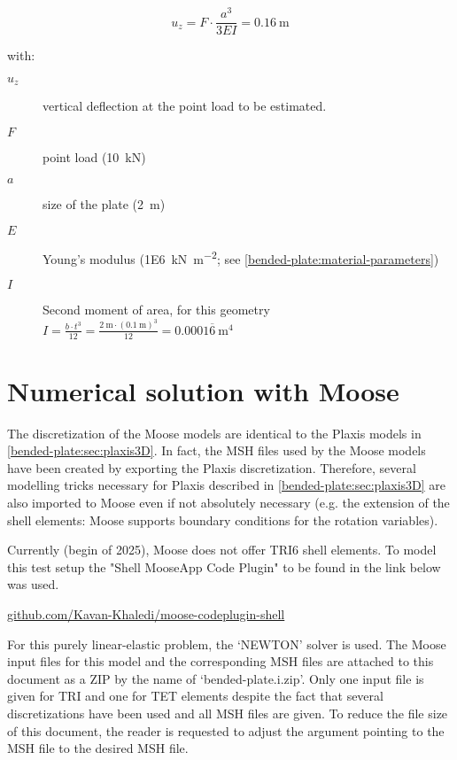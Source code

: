 \begin{equation}
    \label{bended-plate:analytical-solution}
    u_z = F \cdot \frac{a ^ 3}{3EI} = \qty{0.16}{\metre}
\end{equation}

\begin{samepage}
    with:
    \begin{description}
        \item[$u_{z}$] vertical deflection at the point load to be estimated.
        \item[$F$] point load (\qty{10}{\kilo\newton})
        \item[$a$] size of the plate (\qty{2}{\metre})
        \item[$E$] Young's modulus (\qty[per-mode = symbol]{1E6}{\kilo\newton\per\square\metre}; see \autoref{bended-plate:material-parameters})
        \item[$I$] Second moment of area, for this geometry $I = \frac{b \cdot t^3}{12} = \frac{\qty{2}{\metre} \cdot (\qty{0.1}{\metre})^3}{12} = 0.0001\overline{6} \qty{}{\metre}^4 $
    \end{description}
\end{samepage}

\section{Numerical solution with Moose}
\label{bended-plate:sec:moose}

The discretization of the Moose models are identical to the Plaxis models in
\autoref{bended-plate:sec:plaxis3D}. In fact, the MSH files used by the Moose
models have been created by exporting the Plaxis discretization. Therefore,
several modelling tricks necessary for Plaxis described in
\autoref{bended-plate:sec:plaxis3D} are also imported to Moose even if not
absolutely necessary (e.g. the extension of the shell elements: Moose supports
boundary conditions for the rotation variables).

Currently (begin of 2025), Moose does not offer TRI6 shell elements. To model
this test setup the "Shell MooseApp Code Plugin" to be found in the link below
was used.

\href{https://github.com/Kavan-Khaledi/moose-codeplugin-shell}{github.com/Kavan-Khaledi/moose-codeplugin-shell}

For this purely linear-elastic problem, the ‘NEWTON’ solver is used. The Moose
input files for this model and the corresponding MSH files are attached to this
document as a ZIP by the name of ‘bended-plate.i.zip’. Only one input file is
given for TRI and one for TET elements despite the fact that several
discretizations have been used and all MSH files are given. To reduce the file
size of this document, the reader is requested to adjust the argument pointing
to the MSH file  to the desired MSH file.

